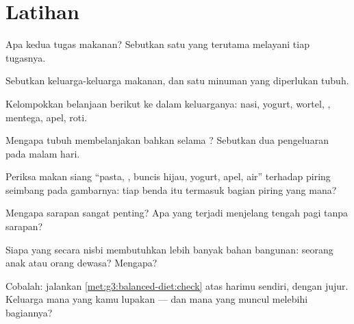 \section{Latihan}

\begin{exercise}[$\star$]\label{exo:g3:balanced-diet:1}
Apa kedua tugas makanan? Sebutkan satu  yang terutama
melayani tiap tugasnya.
\end{exercise}

\begin{exercise}[$\star$]\label{exo:g3:balanced-diet:2}
Sebutkan keluarga-keluarga makanan, dan satu minuman yang diperlukan
tubuh.
\end{exercise}

\begin{exercise}[$\star$]\label{exo:g3:balanced-diet:3}
Kelompokkan belanjaan berikut ke dalam keluarganya: nasi, yogurt,
wortel, , mentega, apel, roti.
\end{exercise}

\begin{exercise}[$\star$]\label{exo:g3:balanced-diet:4}
Mengapa tubuh membelanjakan  bahkan selama ? Sebutkan dua
pengeluaran pada malam hari.
\end{exercise}

\begin{exercise}[$\star$]\label{exo:g3:balanced-diet:5}
Periksa makan siang ``pasta, , buncis hijau, yogurt, apel, air''
terhadap piring seimbang pada gambarnya: tiap benda itu termasuk
bagian piring yang mana?
\end{exercise}

\begin{exercise}[$\star$]\label{exo:g3:balanced-diet:6}
Mengapa sarapan sangat penting? Apa yang terjadi menjelang tengah pagi
tanpa sarapan?
\end{exercise}

\begin{exercise}[$\star$]\label{exo:g3:balanced-diet:7}
Siapa yang secara nisbi membutuhkan lebih banyak bahan bangunan:
seorang anak atau orang dewasa? Mengapa?
\end{exercise}

\begin{exercise}[$\star$]\label{exo:g3:balanced-diet:8}
Cobalah: jalankan \cref{met:g3:balanced-diet:check} atas harimu
sendiri, dengan jujur. Keluarga mana yang kamu lupakan --- dan mana
yang muncul melebihi bagiannya?
\end{exercise}

